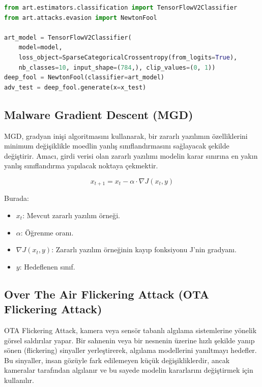 \begin{lstlisting}[language=Python]
from art.estimators.classification import TensorFlowV2Classifier
from art.attacks.evasion import NewtonFool

art_model = TensorFlowV2Classifier(
    model=model, 
    loss_object=SparseCategoricalCrossentropy(from_logits=True), 
    nb_classes=10, input_shape=(784,), clip_values=(0, 1))
deep_fool = NewtonFool(classifier=art_model)
adv_test = deep_fool.generate(x=x_test)
\end{lstlisting}

\newpage

\subsection{Malware Gradient Descent (MGD)}

MGD, gradyan inişi algoritmasını kullanarak, bir zararlı yazılımın özelliklerini minimum değişiklikle moedlin yanlış sınıflandırmasını sağlayacak şekilde değiştirir. Amacı, girdi verisi olan zararlı yazılımı modelin karar sınırına en yakın yanlış sınıflandırma yapılacak noktaya çekmektir.

\[ x_{t+1} = x_t - \alpha \cdot \nabla J(x_t, y) \]

Burada:

\begin{itemize}
    \item $x_t$: Mevcut zararlı yazılım örneği.
    \item $\alpha$: Öğrenme oranı.
    \item $\nabla J(x_t, y)$: Zararlı yazılım örneğinin kayıp fonksiyonu J'nin gradyanı.
    \item $y$: Hedeflenen sınıf.
\end{itemize}

\newpage

\subsection{Over The Air Flickering Attack (OTA Flickering Attack)}

OTA Flickering Attack, kamera veya sensör tabanlı algılama sistemlerine yönelik görsel saldırılar yapar. Bir sahnenin veya bir nesnenin üzerine hızlı şekilde yanıp sönen (flickering) sinyaller yerleştirerek, algılama modellerini yanıltmayı hedefler. Bu sinyaller, insan gözüyle fark edilemeyen küçük değişikliklerdir, ancak kameralar tarafından algılanır ve bu sayede modelin kararlarını değiştirmek için kullanılır.

